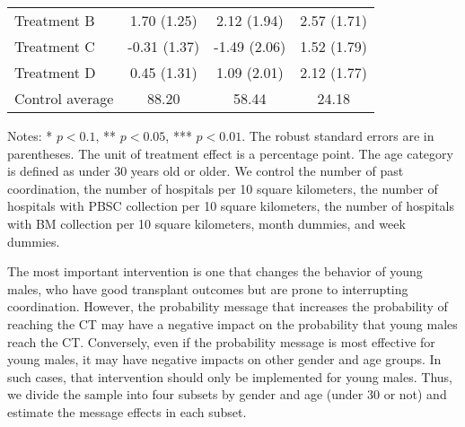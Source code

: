 \documentclass[12pt, a4paper]{article}
\begin{document}
\begin{table}
\begin{threeparttable}
\begin{tabular}[t]{lccc}
\hspace{1em}Treatment B & 1.70 (1.25) & 2.12 (1.94) & 2.57 (1.71)\\
\hspace{1em}Treatment C & -0.31 (1.37) & -1.49 (2.06) & 1.52 (1.79)\\
\hspace{1em}Treatment D & 0.45 (1.31) & 1.09 (2.01) & 2.12 (1.77)\\
\hspace{1em}Control average & 88.20 & 58.44 & 24.18\\
\bottomrule
\end{tabular}
\begin{tablenotes}
\item Notes: * $p < 0.1$, ** $p < 0.05$, *** $p < 0.01$. The robust standard errors are in parentheses. The unit of treatment effect is a percentage point. The age category is defined as under 30 years old or older. We control the number of past coordination, the number of hospitals per 10 square kilometers, the number of hospitals with PBSC collection per 10 square kilometers, the number of hospitals with BM collection per 10 square kilometers, month dummies, and week dummies.
\end{tablenotes}
\end{threeparttable}
\end{table}

The most important intervention is one that changes the behavior of young males, who have good transplant outcomes but are prone to interrupting coordination. However, the probability message that increases the probability of reaching the CT may have a negative impact on the probability that young males reach the CT. Conversely, even if the probability message is most effective for young males, it may have negative impacts on other gender and age groups. In such cases, that intervention should only be implemented for young males. Thus, we divide the sample into four subsets by gender and age (under 30 or not) and estimate the message effects in each subset.
\end{document}
